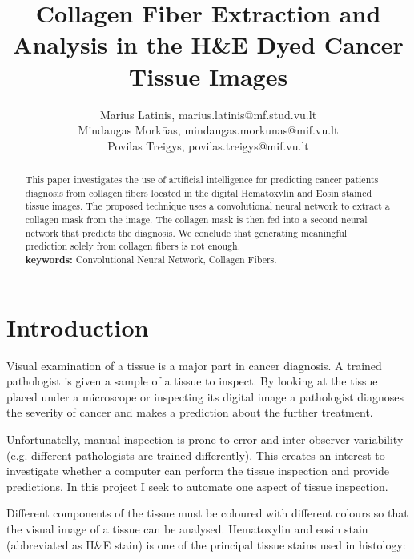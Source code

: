\documentclass{article}
\begin{document}
\title{Collagen Fiber Extraction and Analysis in the H\&E Dyed Cancer Tissue Images}
\author{Marius Latinis, marius.latinis@mf.stud.vu.lt \\
        Mindaugas Mork\=nas, mindaugas.morkunas@mif.vu.lt \\
        Povilas Treigys, povilas.treigys@mif.vu.lt}


\maketitle

\begin{abstract}
    This paper investigates the use of artificial intelligence for
    predicting cancer patients diagnosis from collagen fibers located in the digital
    Hematoxylin and Eosin stained tissue images. The proposed technique uses a convolutional
    neural network to extract a collagen mask from the image. The collagen mask is then fed
    into a second neural network that predicts the diagnosis. We conclude that generating
    meaningful prediction solely from collagen fibers is not enough. \\

    \textbf{keywords:} Convolutional Neural Network, Collagen Fibers.
\end{abstract}


\section{Introduction}

Visual examination of a tissue is a major part in cancer diagnosis. A
trained pathologist is given a sample of a tissue to inspect. By looking at the tissue placed
under a microscope or inspecting its digital image a pathologist diagnoses the severity of
cancer and makes a prediction about the further treatment.

Unfortunatelly, manual inspection is prone to error and inter-observer
variability (e.g. different pathologists are trained differently). This
creates an interest to investigate whether a computer can perform the
tissue inspection and provide predictions. In this project I seek to automate
one aspect of tissue inspection.

Different components of the tissue must be coloured with different colours
so that the visual image of a tissue can be analysed. Hematoxylin and eosin
stain (abbreviated as H\&E stain) is one of the principal tissue stains used
in histology: \\
\end{document}

